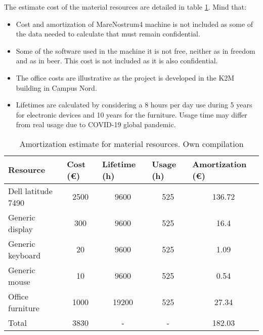 \justify
The estimate cost of the material resources are detailed in table \ref{tab:amort}. Mind that:
\begin{itemize}
  \item Cost and amortization of MareNostrum4 machine is not included as some of the data needed to calculate that must remain confidential.
  \item Some of the software used in the machine it is not free, neither as in freedom and as in beer. This cost is not included as it is also confidential. 
  \item The office costs are illustrative as the project is developed in the K2M building in Campus Nord.
  \item Lifetimes are calculated by considering a 8 hours per day use during 5 years for electronic devices and 10 years for the furniture. Usage time may differ from real usage due to COVID-19 global pandemic. 
\end{itemize}


\begin{table}[htbp!]
\centering
\begin{tabular}{|l|c|c|c|c|}
\hline
Resource           & \multicolumn{1}{l|}{Cost (\euro)} & \multicolumn{1}{l|}{Lifetime (h)} & \multicolumn{1}{l|}{Usage (h)} & \multicolumn{1}{l|}{Amortization (\euro)} \\ \hline
Dell latitude 7490 & 2500                              & 9600                              & 525                            & 136.72                                    \\ \hline
Generic display    & 300                               & 9600                              & 525                            & 16.4                                      \\ \hline
Generic keyboard   & 20                                & 9600                              & 525                            & 1.09                                      \\ \hline
Generic mouse      & 10                                & 9600                              & 525                            & 0.54                                      \\ \hline
Office furniture   & 1000                              & 19200                             & 525                            & 27.34                                     \\ \hline
Total              & 3830                              & -                                 & -                              & 182.03                                    \\ \hline
\end{tabular}
\caption[Amortization estimate for material resources]{Amortization estimate for material resources. Own compilation}
\label{tab:amort}
\end{table}

